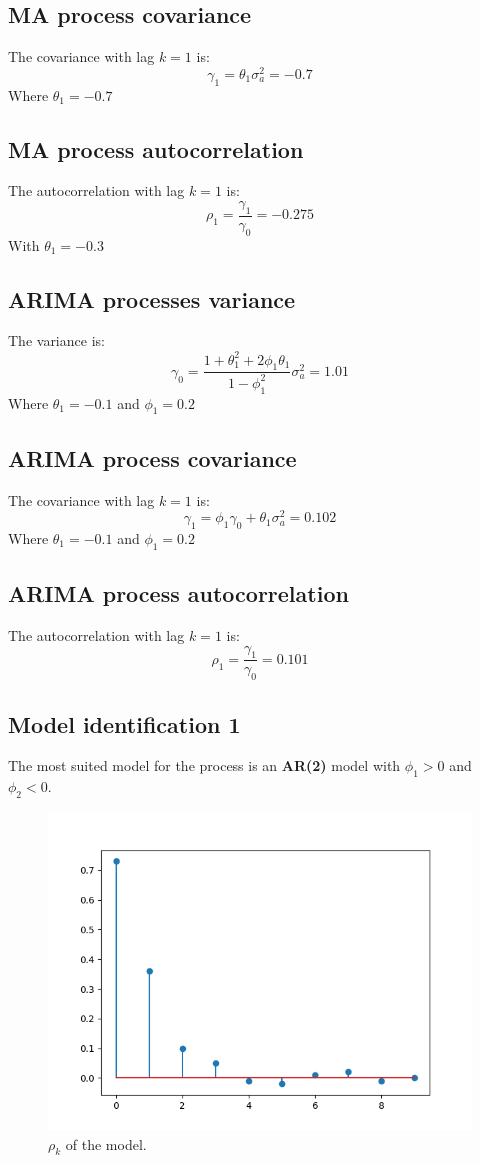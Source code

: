 \documentclass{assignment}
\begin{document}
\subsection{MA process covariance}
\noindent The covariance with lag $k=1$ is: 
$$\gamma_1 = \theta_1\sigma_a^2 = -0.7$$
Where $\theta_1 = -0.7$ 

\subsection{MA process autocorrelation}
\noindent The autocorrelation with lag $k=1$ is:
$$\rho_1 = \frac{\gamma_1}{\gamma_0} = -0.275 $$
With $\theta_1 = -0.3$


\subsection{ARIMA processes variance}
\noindent The variance is: 
$$ \gamma_0 = \frac{1+\theta_1^2+2\phi_1\theta_1}{1-\phi_1^2}\sigma_a^2 = 1.01$$
Where $\theta_1 = -0.1$ and $\phi_1 = 0.2$

\subsection{ARIMA process covariance}
\noindent The covariance with lag $k=1$ is: 
$$\gamma_1 = \phi_1\gamma_0 + \theta_1\sigma_a^2 = 0.102$$
Where $\theta_1 = -0.1$ and $\phi_1 = 0.2$

\subsection{ARIMA process autocorrelation}
\noindent The autocorrelation with lag $k=1$ is:
$$\rho_1 = \frac{\gamma_1}{\gamma_0} = 0.101 $$


\subsection{Model identification 1}
\noindent The most suited model for the process is an \textbf{AR(2)} model with $\phi_1 > 0$ and $\phi_2 < 0 $.
\begin{figure}[H]
    \centering
    \includegraphics[width=0.5\linewidth]{Figuras/model-1.png}
    \caption{$\rho_k$ of the model.}
    \label{fig:enter-label}
\end{figure}
\end{document}
